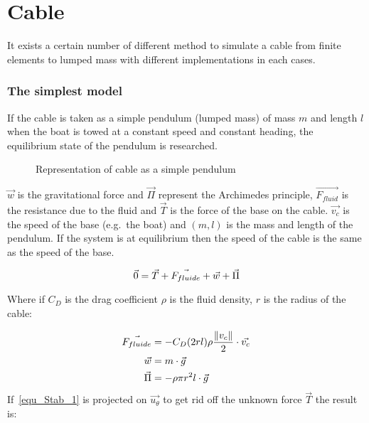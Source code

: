 \section{Cable}
 
 It exists a certain number of different method to simulate a cable from finite elements to lumped mass
 with different implementations in each cases.
 
\subsubsection*{The simplest model}

If the cable is taken as a simple pendulum (lumped mass) of mass $m$ and length $l$ when the boat is towed at a constant speed and constant heading, the equilibrium state of the pendulum is researched.


\begin{figure}[H]
\centering
{} %
{

}
\caption{Representation of cable as a simple pendulum}
\label{fig:model_pendulum}
\end{figure}


$\vec{w}$ is the gravitational force and $\vec{\Pi}$ represent the Archimedes principle, $\vec{F_{fluid}}$ is the resistance due to the fluid and $\vec{T}$ is the force of the base on the cable. $\vec{v_c}$ is the speed of the base (e.g.\ the boat) and $(m,l)$ is the mass and length of the pendulum. If the system is at equilibrium then the speed of the cable is the same as the speed of the base. 

\begin{equation}
 \vec{0} = \vec{T}+\vec{F_{fluide}}+\vec{w}+\vec{\Pi}\\
 \label{equ_Stab_1}
\end{equation}


Where if $C_D$ is the drag coefficient $\rho$ is the fluid density, $r$ is the radius of the cable:


{
\begin{align}
\centering
\vec{F_{fluide}} &= -C_D (2 r l) \rho \frac{ \|v_c\|}{2} \cdot \vec{v_c} \\
\vec{w} &= m \cdot \vec{g} \\
\vec{\Pi} &= - \rho \pi r^2 l \cdot \vec{g}
\end{align}
}
If~\ref{equ_Stab_1} is projected on $\vec{u_{\theta}}$ to get rid off the unknown force $\vec{T}$ the result is:

